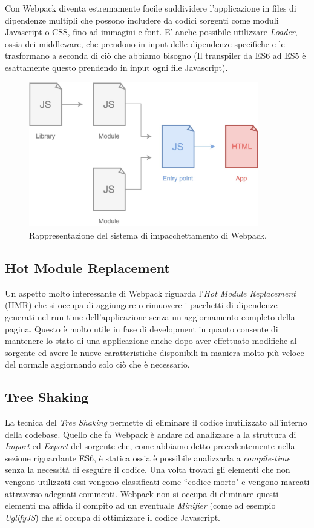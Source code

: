 Con Webpack diventa estremamente facile suddividere l'applicazione in files di dipendenze multipli che possono includere da codici sorgenti come moduli Javascript o CSS, fino ad immagini e font.
E' anche possibile utilizzare \textit{Loader}, ossia dei middleware, che prendono in input delle dipendenze specifiche e le trasformano a seconda di ciò che abbiamo bisogno (Il transpiler da ES6 ad ES5 è esattamente questo prendendo in input ogni file Javascript).

\begin{figure}[h]
\centering
\includegraphics[width=10cm]{./images/webpackWorkflow}
\caption{Rappresentazione del sistema di impacchettamento di Webpack.}
\end{figure}

\subsection{Hot Module Replacement}
Un aspetto molto interessante di Webpack riguarda l'\textit{Hot Module Replacement} (HMR) che si occupa di aggiungere o rimuovere i pacchetti di dipendenze generati nel run-time dell'applicazione senza un aggiornamento completo della pagina. Questo è molto utile in fase di development in quanto consente di mantenere lo stato di una applicazione anche dopo aver effettuato modifiche al sorgente ed avere le nuove caratteristiche disponibili in maniera molto più veloce del normale aggiornando solo ciò che è necessario. 



\subsection{Tree Shaking}
La tecnica del \textit{Tree Shaking} permette di eliminare il codice inutilizzato all'interno della codebase. Quello che fa Webpack è andare ad analizzare a la struttura di \textit{Import} ed \textit{Export} del sorgente che, come abbiamo detto precedentemente nella sezione riguardante ES6, è statica ossia è possibile analizzarla a \textit{compile-time} senza la necessità di eseguire il codice. Una volta trovati gli elementi che non vengono utilizzati essi vengono classificati come “codice morto" e vengono marcati attraverso adeguati commenti. Webpack non si occupa di eliminare questi elementi ma affida il compito ad un eventuale \textit{Minifier} (come ad esempio \textit{UglifyJS}) che si occupa di ottimizzare il codice Javascript.

